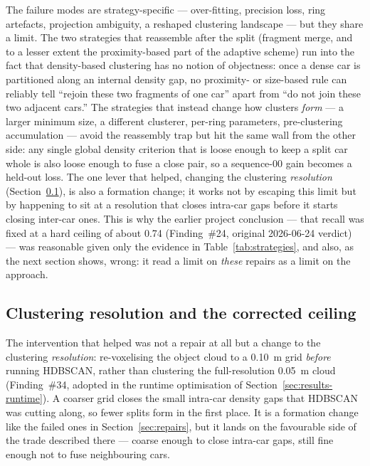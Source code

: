The failure modes are strategy-specific --- over-fitting, precision loss, ring
artefacts, projection ambiguity, a reshaped clustering landscape --- but they share
a limit. The two strategies that reassemble after the split (fragment merge, and to
a lesser extent the proximity-based part of the adaptive scheme) run into the fact
that density-based clustering has no notion of objectness: once a dense car is
partitioned along an internal density gap, no proximity- or size-based rule can
reliably tell ``rejoin these two fragments of one car'' apart from ``do not join
these two adjacent cars.'' The strategies that instead change how clusters
\emph{form} --- a larger minimum size, a different clusterer, per-ring parameters,
pre-clustering accumulation --- avoid the reassembly trap but hit the same wall from
the other side: any single global density criterion that is loose enough to keep a
split car whole is also loose enough to fuse a close pair, so a sequence-00 gain
becomes a held-out loss. The one lever that helped, changing the clustering
\emph{resolution} (Section~\ref{sec:resolution-fix}), is also a formation change; it
works not by escaping this limit but by happening to sit at a resolution that closes
intra-car gaps before it starts closing inter-car ones. This is why the earlier
project conclusion --- that recall was fixed at a hard ceiling of about \num{0.74}
(Finding~\#24, original 2026-06-24 verdict) --- was reasonable given only the evidence
in Table~\ref{tab:strategies}, and also, as the next section shows, wrong: it read a
limit on \emph{these} repairs as a limit on the approach.

\subsection{Clustering resolution and the corrected ceiling}
\label{sec:resolution-fix}

The intervention that helped was not a repair at all but a change to the clustering
\emph{resolution}: re-voxelising the object cloud to a \SI{0.10}{\metre} grid
\emph{before} running HDBSCAN, rather than clustering the full-resolution
\SI{0.05}{\metre} cloud (Finding~\#34, adopted in the runtime optimisation of
Section~\ref{sec:results-runtime}). A coarser grid closes the small intra-car density gaps that HDBSCAN was
cutting along, so fewer splits form in the first place. It is a formation change like
the failed ones in Section~\ref{sec:repairs}, but it lands on the favourable side of
the trade described there --- coarse enough to close intra-car gaps, still fine
enough not to fuse neighbouring cars.

